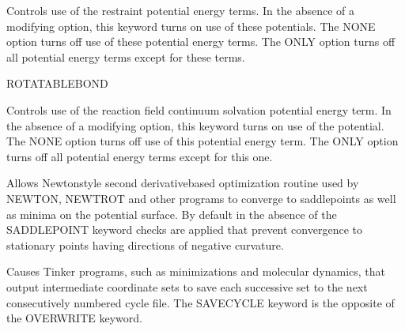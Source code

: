 \documentclass[letterpaper,11pt,english]{sphinxmanual}
\begin{document}
\ignorespaces {}\label{\detokenize{text/keywords:key-restrainterm}}\begin{description}
\sphinxAtStartPar
Controls use of the restraint potential energy terms. In the absence of a modifying option, this keyword turns on use of these potentials. The NONE option turns off use of these potential energy terms. The ONLY option turns off all potential energy terms except for these terms.

\end{description}

\ignorespaces {}\label{\detokenize{text/keywords:key-rotatable-bond}}
\sphinxAtStartPar
ROTATABLE\sphinxhyphen{}BOND

\ignorespaces {}\label{\detokenize{text/keywords:key-rxnfieldterm}}\begin{description}
\sphinxAtStartPar
Controls use of the reaction field continuum solvation potential energy term. In the absence of a modifying option, this keyword turns on use of the potential. The NONE option turns off use of this potential energy term. The ONLY option turns off all potential energy terms except for this one.

\end{description}

\ignorespaces {}\label{\detokenize{text/keywords:key-saddlepoint}}\begin{description}
\sphinxAtStartPar
Allows Newton\sphinxhyphen{}style second derivative\sphinxhyphen{}based optimization routine used by NEWTON, NEWTROT and other programs to converge to saddlepoints as well as minima on the potential surface. By default in the absence of the SADDLEPOINT keyword checks are applied that prevent convergence to stationary points having directions of negative curvature.

\end{description}

\ignorespaces {}\label{\detokenize{text/keywords:key-save-cycle}}\begin{description}
\sphinxAtStartPar
Causes Tinker programs, such as minimizations and molecular dynamics, that output intermediate coordinate sets to save each successive set to the next consecutively numbered cycle file. The SAVE\sphinxhyphen{}CYCLE keyword is the opposite of the OVERWRITE keyword.

\end{description}
\end{document}
